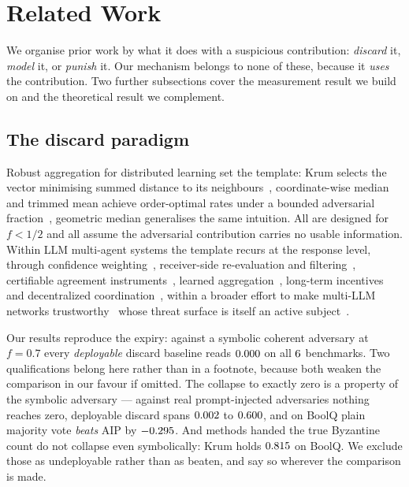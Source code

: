 \section{Related Work}
\label{sec:related}

We organise prior work by what it does with a suspicious contribution:
\emph{discard} it, \emph{model} it, or \emph{punish} it. Our mechanism belongs to
none of these, because it \emph{uses} the contribution. Two further subsections
cover the measurement result we build on and the theoretical result we
complement.

\subsection{The discard paradigm}

Robust aggregation for distributed learning set the template: Krum selects the
vector minimising summed distance to its neighbours~\cite{blanchard2017krum},
coordinate-wise median and trimmed mean achieve order-optimal rates under a
bounded adversarial fraction~\cite{yin2018trimmed}, geometric median generalises
the same intuition. All are designed for $f<1/2$ and all assume the adversarial
contribution carries no usable information. Within LLM multi-agent systems the
template recurs at the response level, through confidence
weighting~\cite{cpwbft}, receiver-side re-evaluation and filtering~\cite{sac},
certifiable agreement instruments~\cite{hcsc}, learned
aggregation~\cite{laacs}, long-term incentives~\cite{fedmarl} and decentralized
coordination~\cite{decentllms}, within a broader effort to make multi-LLM
networks trustworthy~\cite{trustnetwork} whose threat surface is itself an active
subject~\cite{agentattacks}.

Our results reproduce the expiry: against a symbolic coherent adversary at
$f=0.7$ every \emph{deployable} discard baseline reads
$0.000$ on all $6$ benchmarks. Two
qualifications belong here rather than in a footnote, because both weaken the
comparison in our favour if omitted. The collapse to exactly zero is a property
of the symbolic adversary --- against real prompt-injected adversaries nothing
reaches zero, deployable discard spans $0.002$ to
$0.600$, and on BoolQ plain majority vote \emph{beats} AIP by
$-0.295$. And methods handed the true Byzantine count do not
collapse even symbolically: Krum holds $0.815$ on BoolQ.
We exclude those as undeployable rather than as beaten, and say so wherever the
comparison is made.

